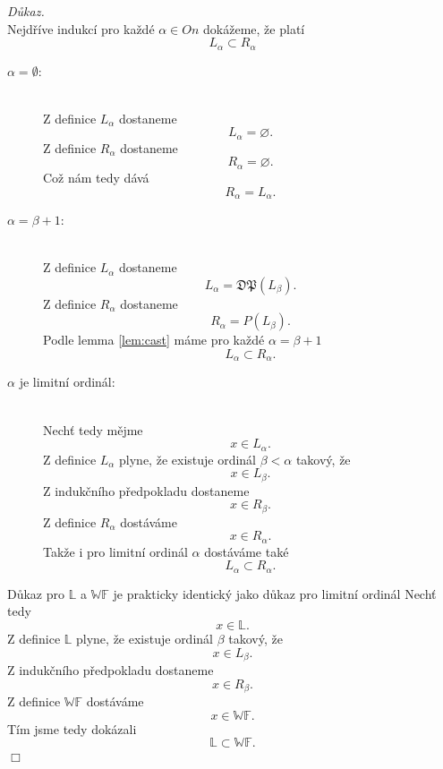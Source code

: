 \documentclass[12pt,a4paper]{article}
\newenvironment{proof}
{\noindent \textit{D\r{u}kaz.}}
{\hspace*{\fill} $\Box$}
\begin{document}
\begin{proof}~\\
Nejd\v{r}\'{i}ve indukc\'{i} pro ka\v{z}d\'{e} $ \alpha \in  \textit{On}$ dok\'{a}\v{z}eme, \v{z}e plat\'{i} \[ L_\alpha \subset R_\alpha \]
\begin{description}
\item[$ \alpha=\emptyset $:]~\\
Z definice $ L_\alpha $ dostaneme
\[ L_\alpha=\varnothing  .\] 
Z definice $ R_\alpha $ dostaneme
\[ R_\alpha=\varnothing . \]
Co\v{z} n\'{a}m tedy d\'{a}v\'{a} \[ R_\alpha=L_\alpha .\]
\item[$ \alpha=\beta+1 $:]~\\
Z definice $ L_\alpha $ dostaneme 
\[ L_{\alpha}=\mathfrak{DP}(L_\beta). \]
Z definice $ R_\alpha $ dostaneme
\[ R_{\alpha}=P(L_\beta) .\]
Podle lemma \ref{lem:cast} m\'{a}me pro ka\v{z}d\'{e} $ \alpha=\beta+1 $
\[ L_\alpha \subset R_\alpha .\]
\item[$ \alpha  $ je limitn\'{i} ordin\'{a}l:]~\\
Nech\v{t} tedy m\v{e}jme 
\[ x \in L_\alpha .\]
Z definice $ L_\alpha  $ plyne, \v{z}e existuje ordin\'{a}l $ \beta < \alpha $ takov\'{y}, \v{z}e 
 \[ x \in L_\beta .\]
Z induk\v{c}n\'{i}ho p\v{r}edpokladu dostaneme
 \[ x \in R_\beta .\]
Z definice $ R_\alpha $ dost\'{a}v\'{a}me 
\[ x \in R_\alpha .\]
Tak\v{z}e i pro limitn\'{i} ordin\'{a}l $ \alpha $ dost\'{a}v\'{a}me tak\'{e}
\[ L_\alpha \subset R_\alpha .\]
\end{description}
D\r{u}kaz pro $ \mathbb{L} $ a $ \mathbb{WF} $ je prakticky identick\'{y} jako d\r{u}kaz pro  limitn\'{i} ordin\'{a}l
Nech\v{t} tedy 
\[ x \in \mathbb{L} .\]
Z definice $ \mathbb{L} $ plyne, \v{z}e existuje ordin\'{a}l $ \beta $ takov\'{y}, \v{z}e 
 \[ x \in L_\beta .\]
Z induk\v{c}n\'{i}ho p\v{r}edpokladu dostaneme
 \[ x \in R_\beta .\]
Z definice $ \mathbb{WF} $ dost\'{a}v\'{a}me 
\[ x \in \mathbb{WF} .\]
T\'{i}m jsme tedy dok\'{a}zali 
\[ \mathbb{L} \subset \mathbb{WF} .\]
\end{proof}~\\
\end{document}
